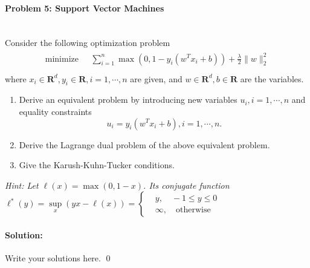 \documentclass[a4paper]{article}
\newenvironment{solution}
{\color{blue} \paragraph{Solution:\\}}
{\newline \qed}
\begin{document}
\paragraph{Problem 5: Support Vector Machines}
~\\
Consider the following optimization problem
\begin{gather*}
\begin{matrix}
\text{minimize~~} & \sum_{i=1}^n\max\left(0,1-y_i(w^Tx_i+b)\right)+\frac{\lambda}{2}\|w\|_2^2\\
\end{matrix}
\end{gather*}
where $x_i\in\mathbf{R}^{d},y_i\in \mathbf{R},i=1,\cdots,n$ are given, and $w\in \mathbf{R}^d,b\in\mathbf{R}$ are the variables.
\begin{enumerate}[(1)]
    \item Derive an equivalent problem by introducing new variables $u_i,i=1,\cdots,n$ and equality constraints \[u_i=y_i(w^Tx_i+b),i=1,\cdots,n.\]
    \item Derive the Lagrange dual problem of the above equivalent problem.
    \item Give the Karush-Kuhn-Tucker conditions.
\end{enumerate}

\noindent\emph{Hint: Let $\ell(x)=\max(0,1-x)$. Its conjugate function $\ell^\ast(y)=\sup\limits_{x}(yx-\ell(x))=\left\{
\begin{aligned}
&y, \quad-1\leq y\leq0 \\
&\infty,\quad\text{otherwise}
\end{aligned}
\right.$}

\begin{solution}
    Write your solutions here.
\end{solution}
\end{document}
